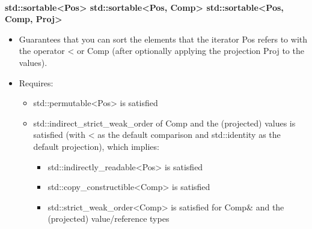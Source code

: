 \noindent
\hspace*{\fill} \\ %
\textbf{std::sortable<Pos>
	std::sortable<Pos, Comp>
	std::sortable<Pos, Comp, Proj>}

\begin{itemize}
\item
Guarantees that you can sort the elements that the iterator Pos refers to with the operator < or Comp (after optionally applying the projection Proj to the values).

\item
Requires:
\begin{itemize}
\item
std::permutable<Pos> is satisfied

\item
std::indirect\_strict\_weak\_order of Comp and the (projected) values is satisfied (with < as the default comparison and std::identity as the default projection), which implies:

\begin{itemize}
\item
std::indirectly\_readable<Pos> is satisfied

\item
std::copy\_constructible<Comp> is satisfied

\item
std::strict\_weak\_order<Comp> is satisfied for Comp\& and the (projected) value/reference types
\end{itemize}
\end{itemize}
\end{itemize}

























